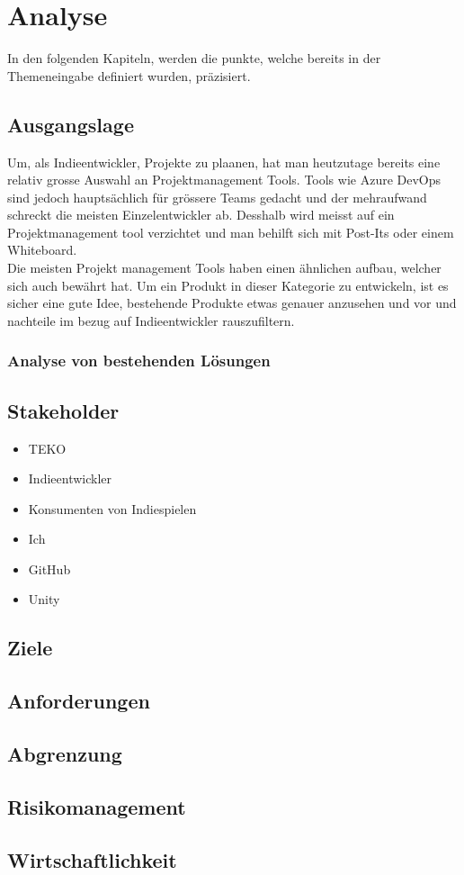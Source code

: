 \section{Analyse}
In den folgenden Kapiteln, werden die punkte, welche bereits in der Themeneingabe
definiert wurden, präzisiert.

\subsection{Ausgangslage}
Um, als Indieentwickler, Projekte zu plaanen, hat man heutzutage bereits eine relativ grosse Auswahl an
Projektmanagement Tools.
Tools wie Azure DevOps sind jedoch hauptsächlich für grössere Teams gedacht und der mehraufwand schreckt die meisten Einzelentwickler ab.
Desshalb wird meisst auf ein Projektmanagement tool verzichtet und man behilft sich mit Post-Its oder einem Whiteboard.\\
Die meisten Projekt management Tools haben einen ähnlichen aufbau, welcher sich auch bewährt hat.
Um ein Produkt in dieser Kategorie zu entwickeln, ist es sicher eine gute Idee, bestehende Produkte etwas genauer anzusehen und vor und nachteile 
im bezug auf Indieentwickler rauszufiltern.

\subsubsection{Analyse von bestehenden Lösungen}


\newpage

\newpage

\subsection{Stakeholder}

\begin{itemize}
    \item TEKO
    \item Indieentwickler
    \item Konsumenten von Indiespielen
    \item Ich
    \item GitHub
    \item Unity
\end{itemize}


\newpage
\subsection{Ziele}
\newpage
\subsection{Anforderungen}
\newpage
\subsection{Abgrenzung}
\newpage
\subsection{Risikomanagement}
\newpage
\subsection{Wirtschaftlichkeit}